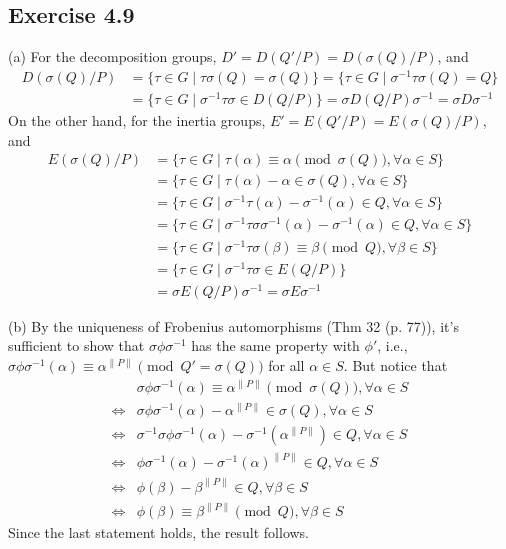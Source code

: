 \documentclass[../Chapter.tex]{subfiles}
\begin{document}

\subsection*{Exercise 4.9}

(a) For the decomposition groups, $D' = D(Q'/P) = D(\sigma(Q)/P)$, and
\begin{align*}
D(\sigma(Q)/P) & = \{\tau\in G\mid \tau\sigma(Q)=\sigma(Q)\} = \{\tau\in G\mid \sigma^{-1}\tau\sigma(Q)=Q\} \\
&= \{\tau\in G\mid \sigma^{-1}\tau\sigma \in D(Q/P)\} = \sigma D(Q/P) \sigma^{-1} = \sigma D\sigma^{-1}
\end{align*}
On the other hand, for the inertia groups, $E' = E(Q'/P) = E(\sigma(Q)/P)$, and
\begin{align*}
E(\sigma(Q)/P) &= \{\tau\in G\mid \tau(\alpha)\equiv\alpha \pmod{\sigma(Q)}, \forall\alpha\in S\} \\
&= \{\tau\in G\mid \tau(\alpha)-\alpha\in\sigma(Q), \forall\alpha\in S\} \\
&= \{\tau\in G\mid \sigma^{-1}\tau(\alpha)-\sigma^{-1}(\alpha)\in Q, \forall\alpha\in S\} \\
&= \{\tau\in G\mid \sigma^{-1}\tau\sigma\sigma^{-1}(\alpha)-\sigma^{-1}(\alpha)\in Q, \forall\alpha\in S\} \\
&= \{\tau\in G\mid \sigma^{-1}\tau\sigma(\beta) \equiv \beta \pmod{Q}, \forall\beta\in S\} \\
&= \{\tau\in G\mid \sigma^{-1}\tau\sigma\in E(Q/P)\} \\
&= \sigma E(Q/P)\sigma^{-1} = \sigma E\sigma^{-1}
\end{align*}

(b) By the uniqueness of Frobenius automorphisms (Thm 32 (p. 77)), it's sufficient to show that $\sigma\phi\sigma^{-1}$ has the same property with $\phi'$, i.e., $\sigma\phi\sigma^{-1}(\alpha)\equiv\alpha^{\|P\|} \pmod{Q'=\sigma(Q)}$ for all $\alpha\in S$. But notice that
\begin{align*}
&\sigma\phi\sigma^{-1}(\alpha)\equiv\alpha^{\|P\|} \pmod{\sigma(Q)}, \forall\alpha\in S \\
\iff{} &\sigma\phi\sigma^{-1}(\alpha)-\alpha^{\|P\|}\in\sigma(Q), \forall\alpha\in S \\
\iff{} &\sigma^{-1}\sigma\phi\sigma^{-1}(\alpha)-\sigma^{-1}(\alpha^{\|P\|}) \in Q, \forall\alpha\in S \\
\iff{} &\phi\sigma^{-1}(\alpha)-\sigma^{-1}(\alpha)^{\|P\|} \in Q, \forall\alpha\in S \\
\iff{} &\phi(\beta)-\beta^{\|P\|} \in Q, \forall\beta\in S \\
\iff{} &\phi(\beta)\equiv\beta^{\|P\|} \pmod{Q}, \forall\beta\in S
\end{align*}
Since the last statement holds, the result follows.
\end{document}

